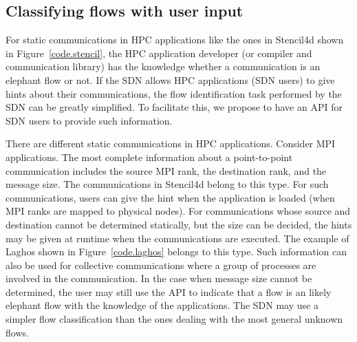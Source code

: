 \subsection{Classifying flows with user input}

For static communications in HPC applications like the ones in Stencil4d
shown in Figure~\ref{code.stencil}, the HPC application developer (or
compiler and communication library) has
the knowledge whether a communication is an
elephant flow or not. If the SDN allows HPC applications (SDN users)
to give hints about their communications, the flow identification
task performed by the SDN can be greatly simplified.
To facilitate this, we propose to have an API for SDN users to provide
such information. 

\begin{comment}
\textcolor{red}{
  The code indicates that each node sends eight communication messages to its neighbors. Additionally, since the neighbors are determined only during the compile time and the set of neighbors do not change during the runtime, user have the ability to correctly predict the communication characteristic. If the user knows the mapping of the ranks to nodes in the HPC system during the running of the application and also the data sent in the MPI calls, they can determine the communication characteristic of the application in the actual system and can determine which flows are elephants and which are mice when a HPC application starts running on a system.}
\end{comment}

There are different static communications in HPC applications. Consider
MPI applications. The most complete information about a point-to-point
communication includes the source MPI rank, the destination rank, and the
message size. The communications in Stencil4d belong to this type. 
For such communications, users can give the hint when the
application is loaded (when MPI ranks are mapped to physical nodes).
For communications whose source and destination cannot be determined
statically, but the size can be decided, the hints may be given at runtime
when the communications are executed.
The example of Laghos shown in Figure~\ref{code.laghos} belongs to this type. 
Such information can also be used
for collective communications where a group of processes are involved in
the communication.
In the case when message size cannot be determined, the user may still use the
API to indicate that a flow is an likely
elephant flow with the knowledge of the applications. The SDN may use a
simpler flow classification than the ones dealing with the most general
unknown flows.
 
